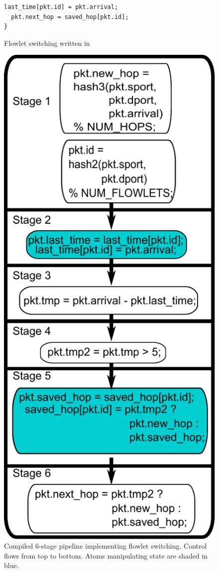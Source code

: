 \begin{figure}[!t]
\begin{minipage}{0.5\textwidth}
\begin{small}
\begin{lstlisting}[style=customc]
  last_time[pkt.id] = pkt.arrival;
  pkt.next_hop = saved_hop[pkt.id];
}
\end{lstlisting}
\end{small}
\caption{Flowlet switching written in \pktlanguage}
\label{fig:flowlet_code}
\end{minipage}
%
\vrule\quad
%
\begin{minipage}{0.4\textwidth}
\includegraphics[width=0.8\columnwidth]{pipe.pdf}
\caption{Compiled 6-stage \absmachine pipeline implementing flowlet
switching.  Control flows from top to bottom. Atoms manipulating state are
shaded in blue.}
\label{fig:flowlet_pipeline}
\end{minipage}
\end{figure}

